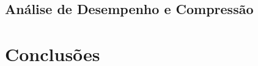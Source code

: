 \documentclass[a4paper, 11pt, portuguese]{article}
\begin{document}

\subsection{Análise de Desempenho e Compressão}



\section{Conclusões}



%
\end{document}
